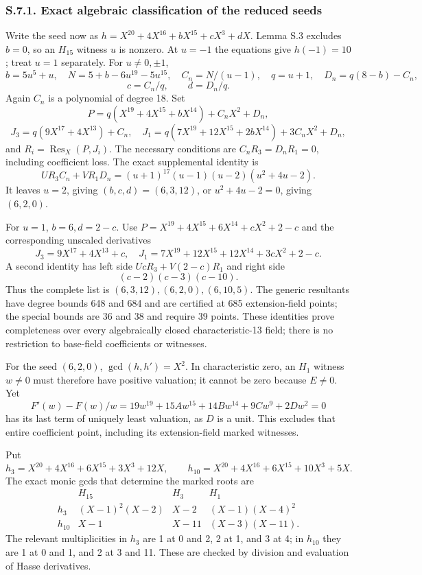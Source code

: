 \documentclass[
  british,
  10pt,
]{article}
\begin{document}
\subsubsection{S.7.1. Exact algebraic classification of the reduced
seeds}\label{s.7.1.-exact-algebraic-classification-of-the-reduced-seeds}

Write the seed now as \(h=X^{20}+4X^{16}+bX^{15}+cX^3+dX\). Lemma S.3
excludes \(b=0\), so an \(H_{15}\) witness \(u\) is nonzero. At \(u=-1\)
the equations give \(h(-1)=10\); treat \(u=1\) separately. For
\(u\ne0,\pm1\), \[
b=5u^5+u,\quad N=5+b-6u^{19}-5u^{15},\quad
C_n=N/(u-1),\quad q=u+1,\quad D_n=q(8-b)-C_n,
\] \[
c=C_n/q,\qquad d=D_n/q.
\] Again \(C_n\) is a polynomial of degree 18. Set \[
P=q(X^{19}+4X^{15}+bX^{14})+C_nX^2+D_n,
\] \[
J_3=q(9X^{17}+4X^{13})+C_n,\quad
J_1=q(7X^{19}+12X^{15}+2bX^{14})+3C_nX^2+D_n,
\] and \(R_i=\operatorname{Res}_X(P,J_i)\). The necessary conditions are
\(C_nR_3=D_nR_1=0\), including coefficient loss. The exact supplemental
identity is \[
UR_3C_n+VR_1D_n=(u+1)^{17}(u-1)(u-2)(u^2+4u-2).
\tag{S16}
\] It leaves \(u=2\), giving \((b,c,d)=(6,3,12)\), or \(u^2+4u-2=0\),
giving \((6,2,0)\).

For \(u=1\), \(b=6,d=2-c\). Use \(P=X^{19}+4X^{15}+6X^{14}+cX^2+2-c\)
and the corresponding unscaled derivatives \[
J_3=9X^{17}+4X^{13}+c,\quad
J_1=7X^{19}+12X^{15}+12X^{14}+3cX^2+2-c.
\] A second identity has left side \(UcR_3+V(2-c)R_1\) and right side \[
(c-2)(c-3)(c-10).
\tag{S17}
\] Thus the complete list is \((6,3,12),(6,2,0),(6,10,5)\). The generic
resultants have degree bounds 648 and 684 and are certified at 685
extension-field points; the special bounds are 36 and 38 and require 39
points. These identities prove completeness over every algebraically
closed characteristic-13 field; there is no restriction to base-field
coefficients or witnesses.

For the seed \((6,2,0)\), \(\gcd(h,h')=X^2\). In characteristic zero, an
\(H_1\) witness \(w\ne0\) must therefore have positive valuation; it
cannot be zero because \(E\ne0\). Yet \[
F'(w)-F(w)/w
=19w^{19}+15Aw^{15}+14Bw^{14}+9Cw^9+2Dw^2=0
\] has its last term of uniquely least valuation, as \(D\) is a unit.
This excludes that entire coefficient point, including its
extension-field marked witnesses.

Put \[
h_3=X^{20}+4X^{16}+6X^{15}+3X^3+12X,\qquad
h_{10}=X^{20}+4X^{16}+6X^{15}+10X^3+5X.
\] The exact monic gcds that determine the marked roots are \[
\begin{array}{c|ccc}
 &H_{15}&H_3&H_1\\ \hline
h_3&(X-1)^2(X-2)&X-2&(X-1)(X-4)^2\\
h_{10}&X-1&X-11&(X-3)(X-11).
\end{array}
\] The relevant multiplicities in \(h_3\) are 1 at 0 and 2, 2 at 1, and
3 at 4; in \(h_{10}\) they are 1 at 0 and 1, and 2 at 3 and 11. These
are checked by division and evaluation of Hasse derivatives.
\end{document}

